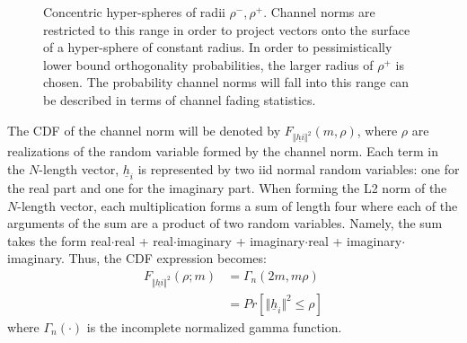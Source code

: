 \begin{figure}
    \centering
      \caption{Concentric hyper-spheres of radii $\rho^-,\rho^+$. Channel norms are restricted to this range in order to project vectors onto the surface of a hyper-sphere of constant radius. In order to pessimistically lower bound orthogonality probabilities, the larger radius of $\rho^+$ is chosen. The probability channel norms will fall into this range can be described in terms of channel fading statistics.}
    \label{fig:concentric_sphere}
\end{figure}
  
The CDF of the channel norm will be denoted by $F_{\Vert\underline{hi}\Vert^2}(m,\rho)$, where $\rho$ are realizations of the random variable formed by the channel norm. Each term in the $N$-length vector, $\underline{h}_i$ is represented by two iid normal random variables: one for the real part and one for the imaginary part. When forming the L2 norm of the $N$-length vector, each multiplication forms a sum of length four where each of the arguments of the sum are a product of two random variables. Namely, the sum takes the form real$\cdot$real + real$\cdot$imaginary + imaginary$\cdot$real + imaginary$\cdot$imaginary. Thus, the CDF expression becomes:
\begin{equation}\label{eq:ch_sq_cdf_chan}
    \begin{aligned}
        F_{\Vert\underline{hi}\Vert^2}(\rho;m)& = \Gamma_n(2m,m\rho)\\
        &= Pr[\Vert\underline{h}_i\Vert^2 \leq \rho]
    \end{aligned}
\end{equation}
where $\Gamma_n(\cdot)$ is the incomplete normalized gamma function.

